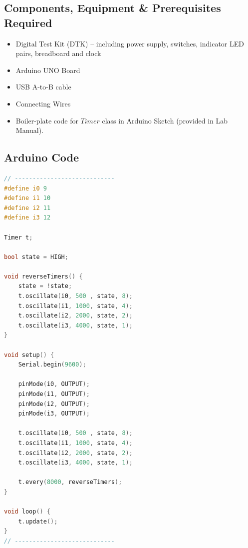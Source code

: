 \documentclass[11pt, a4paper]{article}
\begin{document}
\subsection{Components, Equipment \& Prerequisites Required}
\begin{itemize}
    \item Digital Test Kit (DTK) -- including power supply, switches, indicator LED pairs, breadboard and clock
    \item Arduino UNO Board
    \item USB A-to-B cable
    \item Connecting Wires
    \item Boiler-plate code for $Timer$ class in Arduino Sketch (provided in Lab Manual).
\end{itemize}

\subsection{Arduino Code}

\lstset{style=customstyle}

\begin{lstlisting}[language=C++, caption={Arduino Code for Part C}]
// ----------------------------
#define i0 9
#define i1 10
#define i2 11
#define i3 12

Timer t;

bool state = HIGH;

void reverseTimers() {
  	state = !state;  
    t.oscillate(i0, 500 , state, 8);
    t.oscillate(i1, 1000, state, 4);
    t.oscillate(i2, 2000, state, 2);
    t.oscillate(i3, 4000, state, 1);
}

void setup() {
    Serial.begin(9600);
  
    pinMode(i0, OUTPUT);  
    pinMode(i1, OUTPUT);  
    pinMode(i2, OUTPUT);  
    pinMode(i3, OUTPUT);
  
    t.oscillate(i0, 500 , state, 8);
    t.oscillate(i1, 1000, state, 4);
    t.oscillate(i2, 2000, state, 2);
    t.oscillate(i3, 4000, state, 1);
  
  	t.every(8000, reverseTimers);
}

void loop() {
    t.update();
}
// ----------------------------
\end{lstlisting}
\end{document}
